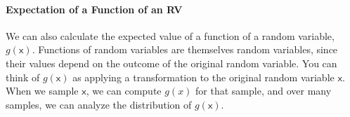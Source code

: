     
    
\paragraph*{Expectation of a Function of an RV}
We can also calculate the expected value of a function of a random variable, $g(\mathsf{x})$. Functions of random variables are themselves random variables, since their values depend on the outcome of the original random variable. You can think of $g(\mathsf{x})$ as applying a transformation to the original random variable $\mathsf{x}$. When we sample $\mathsf{x}$, we can compute $g(x)$ for that sample, and over many samples, we can analyze the distribution of $g(\mathsf{x})$. 

